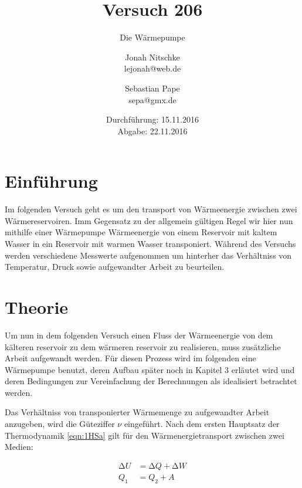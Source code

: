 

\title{Versuch 206}
\subtitle{Die Wärmepumpe}
\author{Jonah Nitschke\\
        lejonah@web.de \and
        Sebastian Pape\\
        sepa@gmx.de}
\date{Durchführung: 15.11.2016\\
      Abgabe: 22.11.2016}



\maketitle

\section{Einführung}

Im folgenden Versuch geht es um den transport von Wärmeenergie zwischen zwei Wärmereservoiren.
Imm Gegensatz zu der allgemein gültigen Regel wir hier nun mithilfe einer Wärmepumpe
Wärmeenergie von einem Reservoir mit kaltem Wasser in ein Reservoir mit warmen Wasser transponiert.
Während des Versuchs werden verschiedene Messwerte aufgenommen um hinterher das Verhältniss von Temperatur,
Druck sowie aufgewandter Arbeit zu beurteilen.

\section{Theorie}


Um nun in dem folgenden Versuch einen Fluss der Wärmeenergie von dem kälteren reservoir zu dem
wärmeren reservoir zu realisieren, muss zusätzliche Arbeit aufgewandt werden. Für diesen Prozess wird
im folgenden eine Wärmepumpe benutzt, deren Aufbau später noch in Kapitel 3 erläutet wird und deren Bedingungen
zur Vereinfachung der Berechnungen als idealisiert betrachtet werden.

Das Verhältniss von transponierter Wärmemenge zu aufgewandter Arbeit anzugeben, wird die Güteziffer
$\nu$ eingeführt. Nach dem ersten Hauptsatz der Thermodynamik \eqref{eqn:1HSa} gilt für den Wärmenergietransport
zwischen zwei Medien:

\begin{align}
  \increment U &= \increment Q + \increment W \label{eqn:1HSa} \\
  Q_1          &= Q_2 + A   \label{eqn:1HSb}
\end{align}

